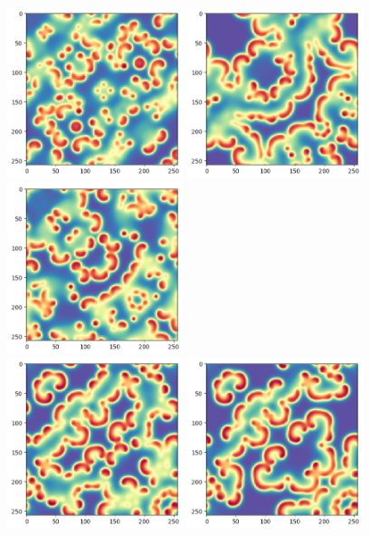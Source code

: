 \begin{center}
\includegraphics[height=5cm]{python_codes/fieldstone_171/RKtest2/alpha1_solution_final_u_RK1.png}
\includegraphics[height=5cm]{python_codes/fieldstone_171/RKtest2/alpha1_solution_final_u_RK2.png}
\includegraphics[height=5cm]{python_codes/fieldstone_171/RKtest2/alpha1_solution_final_u_RK3.png}\\
\includegraphics[height=5cm]{python_codes/fieldstone_171/RKtest2/alpha1_solution_final_u_RK4.png}
\includegraphics[height=5cm]{python_codes/fieldstone_171/RKtest2/alpha1_solution_final_u_RK5.png}

\end{center}
